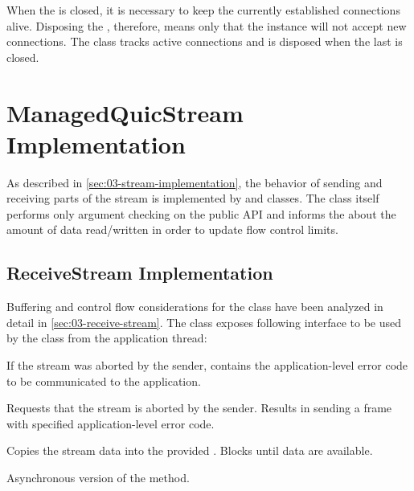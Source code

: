 When the \ManagedQuicListener{} is closed, it is necessary to keep the currently established
connections alive. Disposing the \ManagedQuicListener{}, therefore, means only that the
\QuicServerSocketContext{} instance will not accept new connections. The \QuicServerSocketContext{}
class tracks active connections and is disposed when the last \ManagedQuicConnection{} is
closed.

\section{ManagedQuicStream Implementation}

As described in \autoref{sec:03-stream-implementation}, the behavior of sending and receiving parts
of the stream is implemented by \ReceiveStream{} and \SendStream{} classes. The \ManagedQuicStream{}
class itself performs only argument checking on the public API and informs the
\ManagedQuicConnection{} about the amount of data read/written in order to update flow control
limits.

\subsection{ReceiveStream Implementation}

Buffering and control flow considerations for the \ReceiveStream{} class have been analyzed in
detail in \autoref{sec:03-receive-stream}. The \ReceiveStream{} class exposes following interface to
be used by the \ManagedQuicStream{} class from the application thread:

\begin{description}

  If the stream was aborted by the sender, contains the application-level error code to be
  communicated to the application.

  Requests that the stream is aborted by the sender. Results in sending a \STOPSENDING{} frame with
  specified application-level error code.

  Copies the stream data into the provided \SpanOf{\Byte{}}. Blocks until data are available.

  Asynchronous version of the  method.

\end{description}

